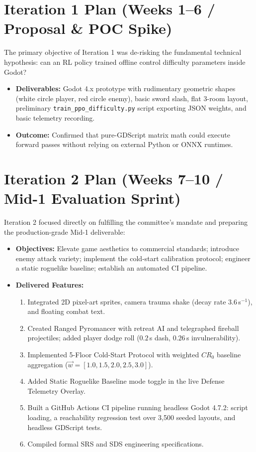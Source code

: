 \section{Iteration 1 Plan (Weeks 1--6 / Proposal \& POC Spike)}
The primary objective of Iteration 1 was de-risking the fundamental technical hypothesis: can an RL policy trained offline control difficulty parameters inside Godot?
\begin{itemize}
    \item \textbf{Deliverables:} Godot 4.x prototype with rudimentary geometric shapes (white circle player, red circle enemy), basic sword slash, flat 3-room layout, preliminary \texttt{train\_ppo\_difficulty.py} script exporting JSON weights, and basic telemetry recording.
    \item \textbf{Outcome:} Confirmed that pure-GDScript matrix math could execute forward passes without relying on external Python or ONNX runtimes.
\end{itemize}

\section{Iteration 2 Plan (Weeks 7--10 / Mid-1 Evaluation Sprint)}
Iteration 2 focused directly on fulfilling the committee's mandate and preparing the production-grade Mid-1 deliverable:
\begin{itemize}
    \item \textbf{Objectives:} Elevate game aesthetics to commercial standards; introduce enemy attack variety; implement the cold-start calibration protocol; engineer a static roguelike baseline; establish an automated CI pipeline.
    \item \textbf{Delivered Features:}
    \begin{enumerate}
        \item Integrated 2D pixel-art sprites, camera trauma shake (decay rate $3.6$\,s$^{-1}$), and floating combat text.
        \item Created Ranged Pyromancer with retreat AI and telegraphed fireball projectiles; added player dodge roll ($0.2$\,s dash, $0.26$\,s invulnerability).
        \item Implemented 5-Floor Cold-Start Protocol with weighted $CR_0$ baseline aggregation ($\vec{w} = [1.0, 1.5, 2.0, 2.5, 3.0]$).
        \item Added Static Roguelike Baseline mode toggle in the live Defense Telemetry Overlay.
        \item Built a GitHub Actions CI pipeline running headless Godot 4.7.2: script loading, a reachability regression test over 3,500 seeded layouts, and headless GDScript tests.
        \item Compiled formal SRS and SDS engineering specifications.
    \end{enumerate}
\end{itemize}

